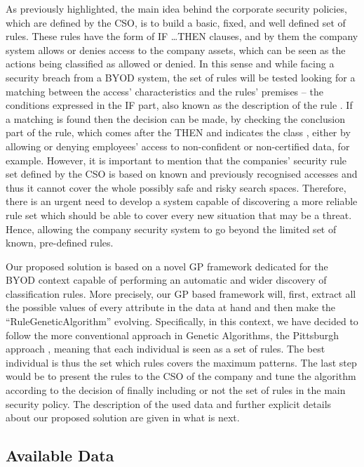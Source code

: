 \documentclass[a4paper,10pt,twocolumn,preprint,3p]{elsarticle}
\begin{document}
As previously highlighted, the main idea behind the corporate security policies, which are defined by the CSO, is to build a basic, fixed, and well defined set of rules. These rules have the form of \textsc{IF \ldots THEN} clauses,  and by them the company system allows or denies access to the company assets, which can be seen as the actions being classified as allowed or denied. In this sense and while facing a security breach from a BYOD system, the set of rules will be tested looking for a matching between the access' characteristics and the rules' premises -- the conditions expressed in the IF part, also known as the description of the rule \cite{DeFalco2002257}. If a matching is found then the decision can be made, by checking the conclusion part of the rule, which comes after the THEN and indicates the class \cite{DeFalco2002257}, either by allowing or denying employees' access to non-confident or non-certified data, for example. However, it is important to mention that the companies' security rule set defined by the CSO is based on known and previously recognised accesses and thus it cannot cover the whole possibly safe and risky search spaces. Therefore, there is an urgent need to develop a system capable of discovering a more reliable rule set which should be able to cover every new situation that may be a threat. Hence, allowing the company security system to go beyond the limited set of known, pre-defined rules.

Our proposed solution is based on a novel GP framework dedicated for the BYOD context capable of performing an automatic and wider discovery of classification rules. More precisely, our GP based framework will, first, extract all the possible values of every attribute in the data at hand and then make the ``RuleGeneticAlgorithm'' evolving. %
Specifically, in this context, we have decided to follow the more conventional approach in Genetic Algorithms, the Pittsburgh approach \cite{freitas2002data}, meaning that each individual is seen as a set of rules. The best individual is thus the set which rules covers the maximum patterns. The last step would be to present the rules to the CSO of the company and tune the algorithm according to the decision of finally including or not the set of rules in the main security policy. The description of the used data and further explicit details about our proposed solution are given in what is next.

\subsection{Available Data}
\label{subsec:data}
\end{document}
